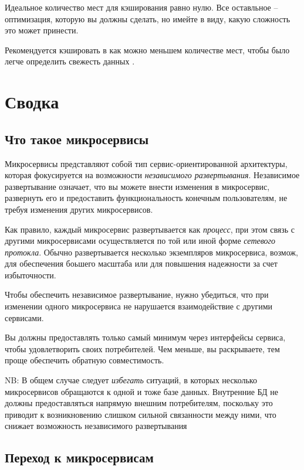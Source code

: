 \documentclass[%
	11pt,
	a4paper,
	utf8,
		]{article}
\begin{document}
Идеальное количество мест для кэширования равно нулю. Все оставльное -- оптимизация, которую вы должны сделать, но имейте в виду, какую сложность это может принести.

Рекомендуется кэшировать в как можно меньшем количестве мест, чтобы было легче определить свежесть данных \cite[]{microservices-2024}.

\section{Сводка}

\subsection{Что такое микросервисы}

Микросервисы представляют собой тип сервис-ориентированной архитектуры, которая фокусируется на возможности \emph{независимого развертывания}. Независимое развертывание означает, что вы можете внести изменения в микросервис, развернуть его и предоставить функциональность конечным пользователям, не требуя изменения других микросервисов.

{\color{blue}Как правило, каждый микросервис развертывается как \emph{процесс}, при этом связь с другими микросервисами осуществляется по той или иной форме \emph{сетевого протокла}. Обычно развертывается несколько экземпляров микросервиса, возмож, для обеспечения боьшего масштаба или для повышения надежности за счет избыточности.}

Чтобы обеспечить независимое развертывание, нужно убедиться, что при изменении одного микросервиса не нарушается взаимодействие с другими сервисами.

Вы должны предоставлять только самый минимум через интерфейсы сервиса, чтобы удовлетворить своих потребителей. Чем меньше, вы раскрываете, тем проще обеспечить обратную совместимость.

{\color{red}NB: В общем случае следует \emph{избегать} ситуаций, в которых несколько микросервисов обращаются к одной и тоже базе данных. Внутренние БД не должны предоставляться напрямую внешним потребителям, поскольку это приводит к возникновению слишком сильной связанности между ними, что снижает возможность независимого развертывания}

\subsection{Переход к микросервисам}
\end{document}
